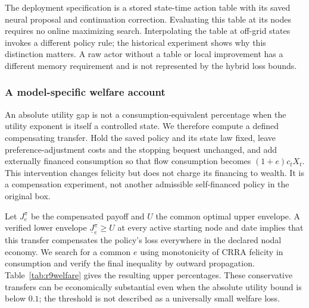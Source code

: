 The deployment specification is a stored state-time action table with its saved neural proposal and continuation correction. Evaluating this table at its nodes requires no online maximizing search. Interpolating the table at off-grid states invokes a different policy rule; the historical experiment shows why this distinction matters. A raw actor without a table or local improvement has a different memory requirement and is not represented by the hybrid loss bounds.

\subsubsection{A model-specific welfare account}
An absolute utility gap is not a consumption-equivalent percentage when the utility exponent is itself a controlled state. We therefore compute a defined compensating transfer. Hold the saved policy and its state law fixed, leave preference-adjustment costs and the stopping bequest unchanged, and add externally financed consumption so that flow consumption becomes $(1+e)c_tX_t$. This intervention changes felicity but does not charge its financing to wealth. It is a compensation experiment, not another admissible self-financed policy in the original box.

Let $J_e^\pi$ be the compensated payoff and $U$ the common optimal upper envelope. A verified lower envelope $\underline J_e^\pi\geq U$ at every active starting node and date implies that this transfer compensates the policy's loss everywhere in the declared nodal economy. We search for a common $e$ using monotonicity of CRRA felicity in consumption and verify the final inequality by outward propagation. Table~\ref{tab:r9welfare} gives the resulting upper percentages. These conservative transfers can be economically substantial even when the absolute utility bound is below $0.1$; the threshold is not described as a universally small welfare loss.

